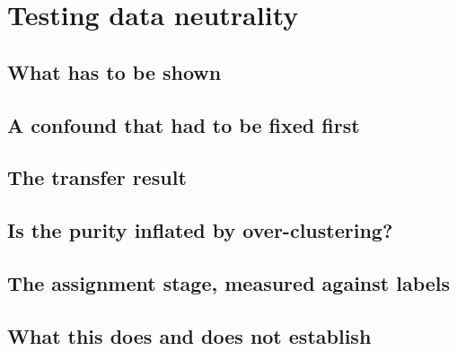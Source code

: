 \section{Testing data neutrality}
\label{sec:neutrality}

\subsection{What has to be shown}

\subsection{A confound that had to be fixed first}
\label{sec:neutrality-confound}

\subsection{The transfer result}

\subsection{Is the purity inflated by over-clustering?}

\subsection{The assignment stage, measured against labels}
\label{sec:neutrality-centroid}

\subsection{What this does and does not establish}

